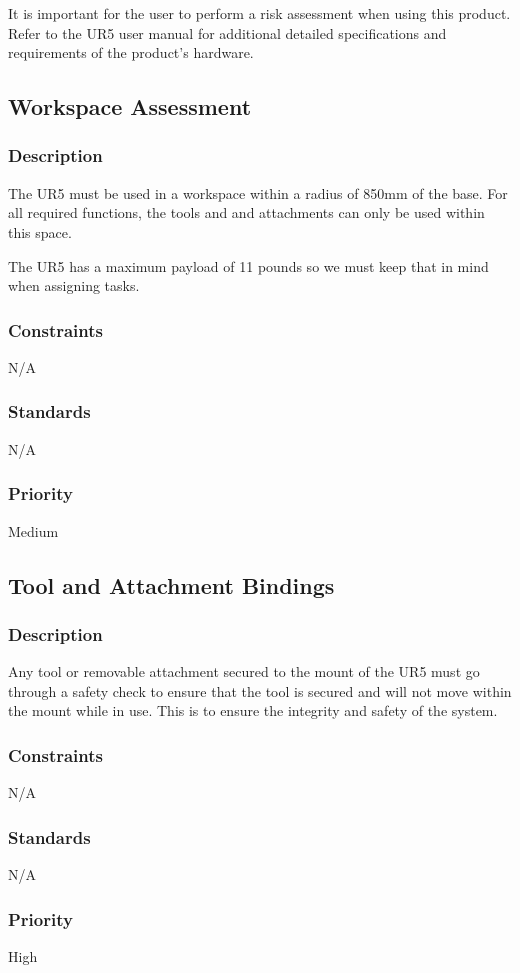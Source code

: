 It is important for the user to perform a risk assessment when using this product. Refer to the UR5 user manual for additional detailed specifications and requirements of the product's hardware. 

\subsection{Workspace Assessment}
\subsubsection{Description}
The UR5 must be used in a workspace within a radius of 850mm of the base. For all required functions, the tools and and attachments can only be used within this space. 

The UR5 has a maximum payload of 11 pounds so we must keep that in mind when assigning tasks.
\subsubsection{Constraints}
N/A
\subsubsection{Standards}
N/A
\subsubsection{Priority}
Medium

\subsection{Tool and Attachment Bindings}
\subsubsection{Description}
Any tool or removable attachment secured to the mount of the UR5 must go through a safety check to ensure that the tool is secured and will not move within the mount while in use. This is to ensure the integrity and safety of the system.
\subsubsection{Constraints}
N/A
\subsubsection{Standards}
N/A
\subsubsection{Priority}
High


